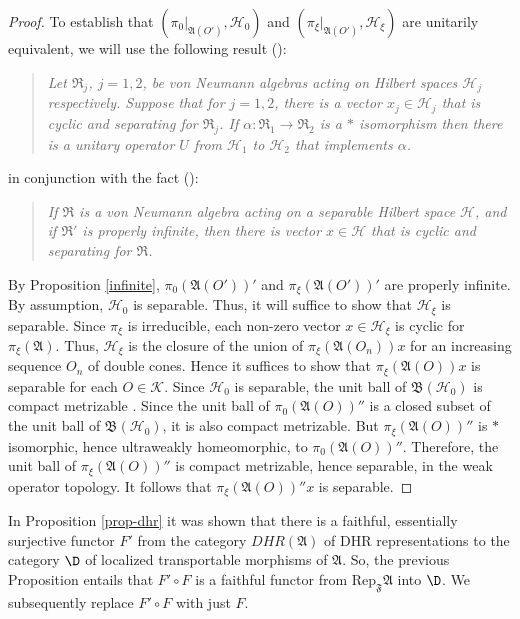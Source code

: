 \documentclass[11pt]{article}
\newcommand{\alg}[1]{\mathfrak{#1}}
\theoremstyle{definition}
\theoremstyle{definition}
\theoremstyle{remark}
\def\2#1{{\mathcal #1}}
\def\al#1{{\mathfrak #1}}
\def\a{\alpha} \def\b{\beta} \def\g{\gamma} \def\d{\delta}
\newcommand{\Rep}{\mathrm{Rep}}
\begin{document}
\begin{proof}
To establish that $(\pi _{0}|_{\alg{A}(O')},\2H_0)$ and $(\pi
_{\xi}|_{\alg{A}(O')},\2H_{\xi})$ are unitarily equivalent, we will
use the following result (\cite[Theorem 7.2.9]{kr}):
\begin{quote}
  \textit{Let $\alg{R}_j$, $j=1,2$, be von Neumann
    algebras acting on Hilbert spaces $\2H _j$
    respectively.  Suppose that for $j=1,2$, there is a
    vector $x_j\in \2H _j$ that is cyclic and
    separating for $\alg{R}_j$.  If $\a :\alg{R}_1\to
    \alg{R}_2$ is a $*$ isomorphism then there is a
    unitary operator $U$ from $\2H _1$ to $\2H _2$ that
    implements $\a$.}
\end{quote}
in conjunction with the fact (\cite[Exercise 9.6.32]{kr}):
\begin{quote}
  \textit{If $\alg{R}$ is a von Neumann algebra acting on a separable Hilbert space
    $\2H$, and if $\alg{R}'$ is properly infinite, then there is vector $x\in \2H$
    that is cyclic and separating for $\alg{R}$.}
\end{quote}
By Proposition \ref{infinite}, $\pi _0 (\alg{A}(O'))'$ and $\pi
_{\xi}(\alg{A}(O'))'$ are properly infinite.  By assumption, $\2H _0$
is separable.  Thus, it will suffice to show that $\2H _{\xi}$ is
separable.  Since $\pi _{\xi}$ is irreducible, each non-zero vector
$x\in \2H _{\xi}$ is cyclic for $\pi _{\xi}(\alg{A})$.  Thus, $\2H
_{\xi}$ is the closure of the union of $\pi _{\xi}(\alg{A}(O_n))x$ for
an increasing sequence $O_n$ of double cones.  Hence it suffices to
show that $\pi _{\xi}(\alg{A}(O))x$ is separable for each $O\in \2K$.
Since $\2H _0$ is separable, the unit ball of $\alg{B}(\2H _0)$ is
compact metrizable \cite[Thm.\ 5.1.3; Exercise 5.7.7]{kr}.  Since the
unit ball of $\pi _0(\alg{A}(O))''$ is a closed subset of the unit
ball of $\alg{B}(\2H _0)$, it is also compact metrizable.  But $\pi
_{\xi}(\alg{A}(O))''$ is $*$ isomorphic, hence ultraweakly
homeomorphic, to $\pi _{0}(\alg{A}(O))''$.  Therefore, the unit ball
of $\pi _{\xi}(\alg{A}(O))''$ is compact metrizable, hence separable,
in the weak operator topology.  It follows that $\pi
_{\xi}(\alg{A}(O))''x$ is separable.
\end{proof}

In Proposition \ref{prop-dhr} it was shown that there is a faithful,
essentially surjective functor $F'$ from the category $DHR(\al A)$ of
DHR representations to the category $\D$ of localized transportable
morphisms of $\al A$.  So, the previous Proposition entails that
$F'\circ F$ is a faithful functor from $\Rep _{\al F}\al A$ into $\D$.
We subsequently replace $F'\circ F$ with just $F$.
\end{document}
